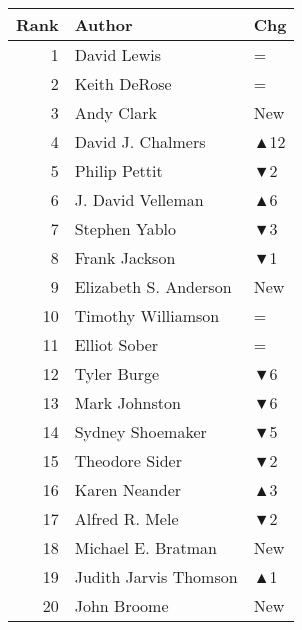 \documentclass[
  10pt,
  letterpaper,
  DIV=11,
  numbers=noendperiod,
  twoside]{scrartcl}
\begin{document}
\begin{table}
\begin{minipage}{0.25\linewidth}
{\begin{tabular}{rll}
\toprule
Rank & Author & Chg\\
\midrule
1 & David Lewis & =\\
2 & Keith DeRose & =\\
3 & Andy Clark & \textcolor[RGB]{34,178,34}{New}\\
4 & David J. Chalmers & \textcolor[RGB]{34,178,34}{▲12}\\
5 & Philip Pettit & \textcolor[RGB]{178,34,34}{▼2}\\
6 & J. David Velleman & \textcolor[RGB]{34,178,34}{▲6}\\
7 & Stephen Yablo & \textcolor[RGB]{178,34,34}{▼3}\\
8 & Frank Jackson & \textcolor[RGB]{178,34,34}{▼1}\\
9 & Elizabeth S. Anderson & \textcolor[RGB]{34,178,34}{New}\\
10 & Timothy Williamson & =\\
11 & Elliot Sober & =\\
12 & Tyler Burge & \textcolor[RGB]{178,34,34}{▼6}\\
13 & Mark Johnston & \textcolor[RGB]{178,34,34}{▼6}\\
14 & Sydney Shoemaker & \textcolor[RGB]{178,34,34}{▼5}\\
15 & Theodore Sider & \textcolor[RGB]{178,34,34}{▼2}\\
16 & Karen Neander & \textcolor[RGB]{34,178,34}{▲3}\\
17 & Alfred R. Mele & \textcolor[RGB]{178,34,34}{▼2}\\
18 & Michael E. Bratman & \textcolor[RGB]{34,178,34}{New}\\
19 & Judith Jarvis Thomson & \textcolor[RGB]{34,178,34}{▲1}\\
20 & John Broome & \textcolor[RGB]{34,178,34}{New}\\
\bottomrule
\end{tabular}

}

\end{minipage}%
%
\begin{minipage}{0.25\linewidth}


\centering{

}
\end{minipage}
\end{table}
\end{document}
